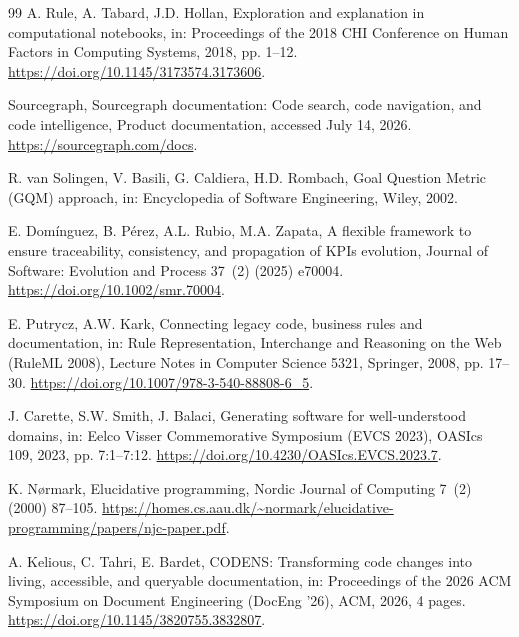 \documentclass[a4paper,fleqn]{cas-dc}
\begin{document}
\begin{thebibliography}{99}
A. Rule, A. Tabard, J.D. Hollan,
\newblock Exploration and explanation in computational notebooks,
\newblock in: Proceedings of the 2018 CHI Conference on Human Factors in Computing Systems, 2018, pp. 1--12.
\newblock \url{https://doi.org/10.1145/3173574.3173606}.

Sourcegraph,
\newblock Sourcegraph documentation: Code search, code navigation, and code intelligence,
\newblock Product documentation, accessed July 14, 2026.
\newblock \url{https://sourcegraph.com/docs}.

R. van Solingen, V. Basili, G. Caldiera, H.D. Rombach,
\newblock Goal Question Metric (GQM) approach,
\newblock in: Encyclopedia of Software Engineering, Wiley, 2002.

E. Dom\'inguez, B. P\'erez, A.L. Rubio, M.A. Zapata,
\newblock A flexible framework to ensure traceability, consistency, and propagation of KPIs evolution,
\newblock Journal of Software: Evolution and Process 37~(2) (2025) e70004.
\newblock \url{https://doi.org/10.1002/smr.70004}.

E. Putrycz, A.W. Kark,
\newblock Connecting legacy code, business rules and documentation,
\newblock in: Rule Representation, Interchange and Reasoning on the Web (RuleML 2008), Lecture Notes in Computer Science 5321, Springer, 2008, pp. 17--30.
\newblock \url{https://doi.org/10.1007/978-3-540-88808-6_5}.

J. Carette, S.W. Smith, J. Balaci,
\newblock Generating software for well-understood domains,
\newblock in: Eelco Visser Commemorative Symposium (EVCS 2023), OASIcs 109, 2023, pp. 7:1--7:12.
\newblock \url{https://doi.org/10.4230/OASIcs.EVCS.2023.7}.

K. N\o rmark,
\newblock Elucidative programming,
\newblock Nordic Journal of Computing 7~(2) (2000) 87--105.
\newblock \url{https://homes.cs.aau.dk/~normark/elucidative-programming/papers/njc-paper.pdf}.

A. Kelious, C. Tahri, E. Bardet,
\newblock CODENS: Transforming code changes into living, accessible, and queryable documentation,
\newblock in: Proceedings of the 2026 ACM Symposium on Document Engineering (DocEng '26), ACM, 2026, 4 pages.
\newblock \url{https://doi.org/10.1145/3820755.3832807}.


\end{thebibliography}
\end{document}
